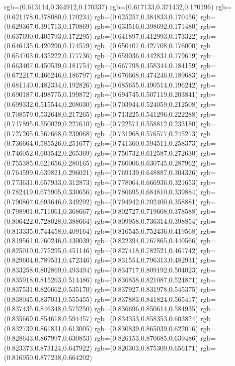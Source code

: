 {{{			rgb=(0.613114,0.364912,0.170337)
			rgb=(0.617133,0.371432,0.170196)
			rgb=(0.621178,0.378080,0.170234)
			rgb=(0.625257,0.384833,0.170456)
			rgb=(0.629367,0.391713,0.170869)
			rgb=(0.633516,0.398692,0.171480)
			rgb=(0.637690,0.405793,0.172295)
			rgb=(0.641897,0.412993,0.173322)
			rgb=(0.646135,0.420290,0.174579)
			rgb=(0.650407,0.427708,0.176000)
			rgb=(0.654703,0.435222,0.177736)
			rgb=(0.659036,0.442831,0.179619)
			rgb=(0.663407,0.450539,0.181754)
			rgb=(0.667798,0.458344,0.184159)
			rgb=(0.672217,0.466246,0.186797)
			rgb=(0.676668,0.474246,0.189683)
			rgb=(0.681140,0.482334,0.192826)
			rgb=(0.685655,0.490514,0.196242)
			rgb=(0.690187,0.498775,0.199872)
			rgb=(0.694745,0.507119,0.203841)
			rgb=(0.699332,0.515544,0.208030)
			rgb=(0.703944,0.524059,0.212508)
			rgb=(0.708579,0.532648,0.217265)
			rgb=(0.713225,0.541296,0.222288)
			rgb=(0.717895,0.550029,0.227610)
			rgb=(0.722571,0.558812,0.233180)
			rgb=(0.727265,0.567668,0.239068)
			rgb=(0.731968,0.576577,0.245213)
			rgb=(0.736664,0.585526,0.251677)
			rgb=(0.741360,0.594511,0.258373)
			rgb=(0.746052,0.603542,0.265369)
			rgb=(0.750732,0.612587,0.272630)
			rgb=(0.755385,0.621656,0.280165)
			rgb=(0.760006,0.630745,0.287962)
			rgb=(0.764599,0.639821,0.296021)
			rgb=(0.769139,0.648887,0.304326)
			rgb=(0.773631,0.657933,0.312873)
			rgb=(0.778064,0.666936,0.321653)
			rgb=(0.782419,0.675905,0.330656)
			rgb=(0.786695,0.684810,0.339884)
			rgb=(0.790867,0.693646,0.349292)
			rgb=(0.794942,0.702400,0.358881)
			rgb=(0.798901,0.711061,0.368667)
			rgb=(0.802727,0.719608,0.378588)
			rgb=(0.806422,0.728028,0.388664)
			rgb=(0.809958,0.736314,0.398854)
			rgb=(0.813335,0.744458,0.409164)
			rgb=(0.816545,0.752436,0.419568)
			rgb=(0.819561,0.760246,0.430039)
			rgb=(0.822394,0.767865,0.440566)
			rgb=(0.825010,0.775295,0.451146)
			rgb=(0.827418,0.782521,0.461742)
			rgb=(0.829604,0.789531,0.472346)
			rgb=(0.831554,0.796313,0.482931)
			rgb=(0.833258,0.802869,0.493494)
			rgb=(0.834717,0.809192,0.504023)
			rgb=(0.835918,0.815263,0.514486)
			rgb=(0.836858,0.821087,0.524871)
			rgb=(0.837531,0.826662,0.535170)
			rgb=(0.837927,0.831978,0.545375)
			rgb=(0.838045,0.837031,0.555455)
			rgb=(0.837883,0.841824,0.565417)
			rgb=(0.837435,0.846348,0.575250)
			rgb=(0.836696,0.850614,0.584935)
			rgb=(0.835669,0.854618,0.594457)
			rgb=(0.834353,0.858353,0.603824)
			rgb=(0.832739,0.861831,0.613005)
			rgb=(0.830839,0.865039,0.622016)
			rgb=(0.828643,0.867997,0.630853)
			rgb=(0.826153,0.870685,0.639486)
			rgb=(0.823373,0.873124,0.647922)
			rgb=(0.820303,0.875309,0.656171)
			rgb=(0.816950,0.877238,0.664202)
}}}
